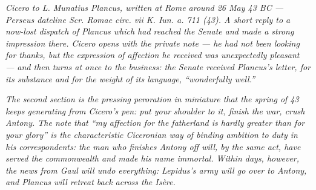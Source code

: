 
\textit{Cicero to L. Munatius Plancus, written at Rome around
26 May 43 BC --- Perseus dateline \textit{Scr. Romae circ.
vii K. Iun. a. 711 (43)}. A short reply to a now-lost
dispatch of Plancus which had reached the Senate and made a
strong impression there. Cicero opens with the private note
--- he had not been looking for thanks, but the expression
of affection he received was unexpectedly pleasant --- and
then turns at once to the business: the Senate received
Plancus's letter, for its substance and for the weight of
its language, ``wonderfully well.''}

\textit{The second section is the pressing peroration in
miniature that the spring of 43 keeps generating from
Cicero's pen: put your shoulder to it, finish the war,
crush Antony. The note that ``my affection for the
fatherland is hardly greater than for your glory'' is the
characteristic Ciceronian way of binding ambition to duty
in his correspondents: the man who finishes Antony off
will, by the same act, have served the commonwealth and
made his name immortal. Within days, however, the news
from Gaul will undo everything: Lepidus's army will go
over to Antony, and Plancus will retreat back across the
Is\`ere.}

